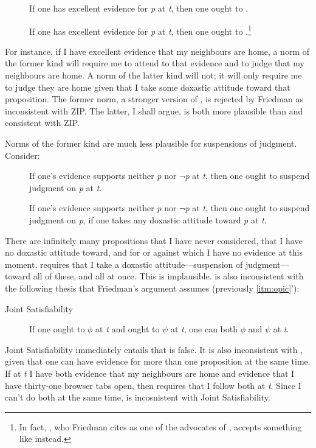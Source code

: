 \documentclass[12pt]{article}
\begin{document}
\begin{description}
    \item[\eo] If one has excellent evidence for \textit{p} at \textit{t}, then one ought to \jud{}.
    \item[\eoc] If one has excellent evidence for \textit{p} at \textit{t}, then one ought to \judif{}.\footnote{In fact, \textcite[679]{feldman_ethics_2000}, who Friedman cites as one of the advocates of \eo{}, accepts something like \eoc{} instead.}
\end{description}
%
For instance, if I have excellent evidence that my neighbours are home, a norm of the former kind will require me to attend to that evidence and to judge that my neighbours are home. A norm of the latter kind will not; it will only require me to judge they are home given that I take some doxastic attitude toward that proposition. The former norm, a stronger version of \ep{}, is rejected by Friedman as inconsistent with ZIP. The latter, I shall argue, is both more plausible than \eo{} and consistent with ZIP.

Norms of the former kind are much less plausible for suspensions of judgment. Consider:

\begin{description}
    \item[\so] If one's evidence supports neither \textit{p} nor $\neg $\textit{p} at \textit{t}, then one ought to suspend judgment on \textit{p} at \textit{t}.
    \item[\soc] If one's evidence supports neither \textit{p} nor $\neg $\textit{p} at \textit{t}, then one ought to suspend judgment on \textit{p}, if one takes any doxastic attitude toward \textit{p} at \textit{t}.
\end{description}
%
There are infinitely many propositions that I have never considered, that I have no doxastic attitude toward, and for or against which I have no evidence at this moment. \so{} requires that I take a doxastic attitude---suspension of judgment---toward all of these, and all at once. This is implausible. \so{} is also inconsistent with the following thesis that Friedman's argument assumes (previously \ref{itm:opic}'):

%
\newcommand{\js}{Joint Satisfiability}
\begin{description}
    \item[\js{}] If one ought to $\phi$ at \textit{t} and ought to $\psi$ at \textit{t}, one can both $\phi$ and $\psi$ at \textit{t}.
\end{description}
%
\js{} immediately entails that \so{} is false. It is also inconsistent with \eo{}, given that one can have evidence for more than one proposition at the same time. If at \textit{t} I have both evidence that my neighbours are home and evidence that I have thirty-one browser tabs open, then \eo{} requires that I follow both at \textit{t}. Since I can't do both at the same time, \eo{} is incosnistent with \js{}.
\end{document}
